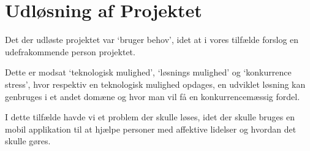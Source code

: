 \section{Udløsning af Projektet}
Det der udløste projektet var `bruger behov', idet at i vores tilfælde forslog en udefrakommende person projektet. 

Dette er modsat `teknologisk mulighed', `løsnings mulighed' og `konkurrence stress', hvor respektiv en teknologisk mulighed opdages, en udviklet løsning kan genbruges i et andet domæne og hvor man vil få en konkurrencemæssig fordel.  

I dette tilfælde havde vi et problem der skulle løses, idet der skulle bruges en mobil applikation til at hjælpe personer med affektive lidelser og hvordan det skulle gøres. 